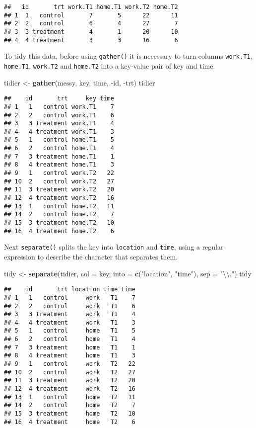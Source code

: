 \documentclass[]{book}
\newenvironment{Shaded}{\begin{snugshade}}{\end{snugshade}}
\newcommand{\KeywordTok}[1]{\textcolor[rgb]{0.13,0.29,0.53}{\textbf{{#1}}}}
\newcommand{\DataTypeTok}[1]{\textcolor[rgb]{0.13,0.29,0.53}{{#1}}}
\newcommand{\CharTok}[1]{\textcolor[rgb]{0.31,0.60,0.02}{{#1}}}
\newcommand{\StringTok}[1]{\textcolor[rgb]{0.31,0.60,0.02}{{#1}}}
\newcommand{\NormalTok}[1]{{#1}}
\begin{document}
\begin{verbatim}
##   id       trt work.T1 home.T1 work.T2 home.T2
## 1  1   control       7       5      22      11
## 2  2   control       6       4      27       7
## 3  3 treatment       4       1      20      10
## 4  4 treatment       3       3      16       6
\end{verbatim}

To tidy this data, before using \texttt{gather()} it is necessary to
turn columns \texttt{work.T1}, \texttt{home.T1}, \texttt{work.T2} and
\texttt{home.T2} into a key-value pair of key and time.

\begin{Shaded}
\begin{Highlighting}[]
\NormalTok{tidier <-}\StringTok{ }\KeywordTok{gather}\NormalTok{(messy, key, time, -id, -trt)}
\NormalTok{tidier}
\end{Highlighting}
\end{Shaded}

\begin{verbatim}
##    id       trt     key time
## 1   1   control work.T1    7
## 2   2   control work.T1    6
## 3   3 treatment work.T1    4
## 4   4 treatment work.T1    3
## 5   1   control home.T1    5
## 6   2   control home.T1    4
## 7   3 treatment home.T1    1
## 8   4 treatment home.T1    3
## 9   1   control work.T2   22
## 10  2   control work.T2   27
## 11  3 treatment work.T2   20
## 12  4 treatment work.T2   16
## 13  1   control home.T2   11
## 14  2   control home.T2    7
## 15  3 treatment home.T2   10
## 16  4 treatment home.T2    6
\end{verbatim}

Next \texttt{separate()} splits the key into \texttt{location} and
\texttt{time}, using a regular expression to describe the character that
separates them.

\begin{Shaded}
\begin{Highlighting}[]
\NormalTok{tidy <-}\StringTok{ }\KeywordTok{separate}\NormalTok{(tidier, }\DataTypeTok{col =} \NormalTok{key, }\DataTypeTok{into =} \KeywordTok{c}\NormalTok{(}\StringTok{"location"}\NormalTok{, }\StringTok{"time"}\NormalTok{), }\DataTypeTok{sep =} \StringTok{"}\CharTok{\textbackslash{}\textbackslash{}}\StringTok{."}\NormalTok{)}
\NormalTok{tidy}
\end{Highlighting}
\end{Shaded}

\begin{verbatim}
##    id       trt location time time
## 1   1   control     work   T1    7
## 2   2   control     work   T1    6
## 3   3 treatment     work   T1    4
## 4   4 treatment     work   T1    3
## 5   1   control     home   T1    5
## 6   2   control     home   T1    4
## 7   3 treatment     home   T1    1
## 8   4 treatment     home   T1    3
## 9   1   control     work   T2   22
## 10  2   control     work   T2   27
## 11  3 treatment     work   T2   20
## 12  4 treatment     work   T2   16
## 13  1   control     home   T2   11
## 14  2   control     home   T2    7
## 15  3 treatment     home   T2   10
## 16  4 treatment     home   T2    6
\end{verbatim}
\end{document}
